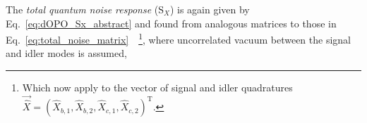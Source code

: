 
The \emph{total quantum noise response} ($\text{S}_X$) is again given by Eq.~\ref{eq:dOPO_Sx_abstract} and found from analogous matrices to those in Eq.~\ref{eq:total_noise_matrix}~\cite{}~\footnote{Which now apply to the vector of signal and idler quadratures $\vec{\hat X}=(\hat X_{b,1},\hat X_{b,2},\hat X_{c,1},\hat X_{c,2})^\text{T}$.}, where uncorrelated vacuum between the signal and idler modes is assumed, 

